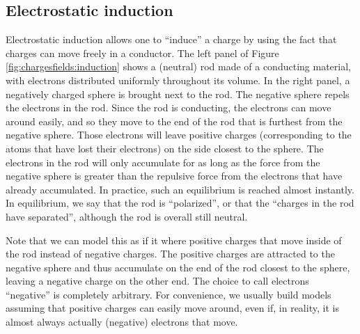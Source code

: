 
\subsection{Electrostatic induction}
Electrostatic induction allows one to ``induce'' a charge by using the fact that charges can move freely in a conductor. The left panel of Figure \ref{fig:chargesfields:induction} shows a (neutral) rod made of a conducting material, with electrons distributed uniformly throughout its volume. In the right panel, a negatively charged sphere is brought next to the rod. The negative sphere repels the electrons in the rod. Since the rod is conducting, the electrons can move around easily, and so they move to the end of the rod that is furthest from the negative sphere. Those electrons will leave positive charges (corresponding to the atoms that have lost their electrons) on the side closest to the sphere. The electrons in the rod will only accumulate for as long as the force from the negative sphere is greater than the repulsive force from the electrons that have already accumulated. In practice, such an equilibrium is reached almost instantly. In equilibrium, we say that the rod is ``polarized'', or that the ``charges in the rod have separated'', although the rod is overall still neutral.

Note that we can model this as if it where positive charges that move inside of the rod instead of negative charges. The positive charges are attracted to the negative sphere and thus accumulate on the end of the rod closest to the sphere, leaving a negative charge on the other end. The choice to call electrons ``negative'' is completely arbitrary. For convenience, we usually build models assuming that positive charges can easily move around, even if, in reality, it is almost always actually (negative) electrons that move.


